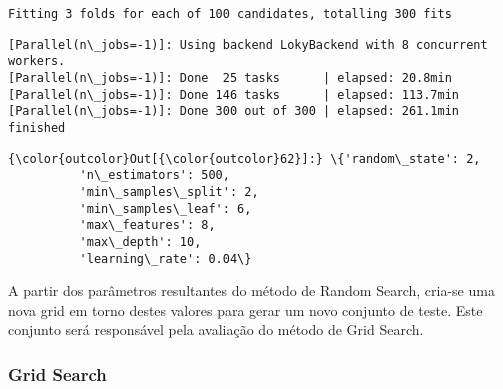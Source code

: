 \documentclass[11pt]{article}
\begin{document}
    \begin{Verbatim}[commandchars=\\\{\}]
Fitting 3 folds for each of 100 candidates, totalling 300 fits

    \end{Verbatim}

    \begin{Verbatim}[commandchars=\\\{\}]
[Parallel(n\_jobs=-1)]: Using backend LokyBackend with 8 concurrent workers.
[Parallel(n\_jobs=-1)]: Done  25 tasks      | elapsed: 20.8min
[Parallel(n\_jobs=-1)]: Done 146 tasks      | elapsed: 113.7min
[Parallel(n\_jobs=-1)]: Done 300 out of 300 | elapsed: 261.1min finished

    \end{Verbatim}

\begin{Verbatim}[commandchars=\\\{\}]
{\color{outcolor}Out[{\color{outcolor}62}]:} \{'random\_state': 2,
          'n\_estimators': 500,
          'min\_samples\_split': 2,
          'min\_samples\_leaf': 6,
          'max\_features': 8,
          'max\_depth': 10,
          'learning\_rate': 0.04\}
\end{Verbatim}
            
    A partir dos parâmetros resultantes do método de Random Search, cria-se
uma nova grid em torno destes valores para gerar um novo conjunto de
teste. Este conjunto será responsável pela avaliação do método de Grid
Search.

    \hypertarget{grid-search}{%
\subsubsection{Grid Search}\label{grid-search}}
\end{document}
